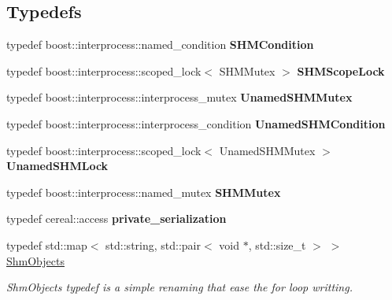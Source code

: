 \subsection*{Typedefs}
\begin{DoxyCompactItemize}
\item 
\mbox{\label{namespaceshared__memory_a98598a317e2364e30dec871c52491d3c}} 
typedef boost\+::interprocess\+::named\+\_\+condition {\bfseries S\+H\+M\+Condition}
\item 
\mbox{\label{namespaceshared__memory_aa1e27e85804c1f1c0b7c1bf077add7bf}} 
typedef boost\+::interprocess\+::scoped\+\_\+lock$<$ S\+H\+M\+Mutex $>$ {\bfseries S\+H\+M\+Scope\+Lock}
\item 
\mbox{\label{namespaceshared__memory_a2a3aa667d92610e695d7948a834172f1}} 
typedef boost\+::interprocess\+::interprocess\+\_\+mutex {\bfseries Unamed\+S\+H\+M\+Mutex}
\item 
\mbox{\label{namespaceshared__memory_a83b64c7cfca3d52b46e5e9833968a7b9}} 
typedef boost\+::interprocess\+::interprocess\+\_\+condition {\bfseries Unamed\+S\+H\+M\+Condition}
\item 
\mbox{\label{namespaceshared__memory_a0b94121a6c0d65beda535a70704a1aa5}} 
typedef boost\+::interprocess\+::scoped\+\_\+lock$<$ Unamed\+S\+H\+M\+Mutex $>$ {\bfseries Unamed\+S\+H\+M\+Lock}
\item 
\mbox{\label{namespaceshared__memory_a9e455ab41b63e529ceca7424dbf13ba1}} 
typedef boost\+::interprocess\+::named\+\_\+mutex {\bfseries S\+H\+M\+Mutex}
\item 
\mbox{\label{namespaceshared__memory_ada3eeebd8f77a3757ad50c9401bcd249}} 
typedef cereal\+::access {\bfseries private\+\_\+serialization}
\item 
\mbox{\label{namespaceshared__memory_ae50b2192256821112a69e47d5314b467}} 
typedef std\+::map$<$ std\+::string, std\+::pair$<$ void $\ast$, std\+::size\+\_\+t $>$ $>$ \hyperlink{namespaceshared__memory_ae50b2192256821112a69e47d5314b467}{Shm\+Objects}
\begin{DoxyCompactList}\small\item\em Shm\+Objects typedef is a simple renaming that ease the for loop writting. \end{DoxyCompactList}\item 

\end{DoxyCompactItemize}

